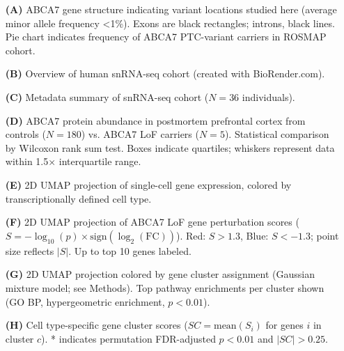 \documentclass[12pt]{article}
\begin{document}
\begin{itemize}
    \item[\textbf{(A)}] ABCA7 gene structure indicating variant locations studied here (average minor allele frequency <1\%). Exons are black rectangles; introns, black lines. Pie chart indicates frequency of ABCA7 PTC-variant carriers in ROSMAP cohort.
    \item[\textbf{(B)}] Overview of human snRNA-seq cohort (created with BioRender.com).
    \item[\textbf{(C)}] Metadata summary of snRNA-seq cohort ($N=36$ individuals).
    \item[\textbf{(D)}] ABCA7 protein abundance in postmortem prefrontal cortex from controls ($N=180$) vs. ABCA7 LoF carriers ($N=5$). Statistical comparison by Wilcoxon rank sum test. Boxes indicate quartiles; whiskers represent data within 1.5× interquartile range.
    \item[\textbf{(E)}] 2D UMAP projection of single-cell gene expression, colored by transcriptionally defined cell type.
    \item[\textbf{(F)}] 2D UMAP projection of ABCA7 LoF gene perturbation scores ($S = -\log_{10}(p)\times\text{sign}(\log_2(\text{FC}))$). Red: $S>1.3$, Blue: $S<-1.3$; point size reflects $|S|$. Up to top 10 genes labeled.
    \item[\textbf{(G)}] 2D UMAP projection colored by gene cluster assignment (Gaussian mixture model; see Methods). Top pathway enrichments per cluster shown (GO BP, hypergeometric enrichment, $p<0.01$).
    \item[\textbf{(H)}] Cell type-specific gene cluster scores ($SC=\text{mean}(S_i)$ for genes $i$ in cluster $c$). * indicates permutation FDR-adjusted $p<0.01$ and $|SC|>0.25$.
\end{itemize} \clearpage
\end{document}
